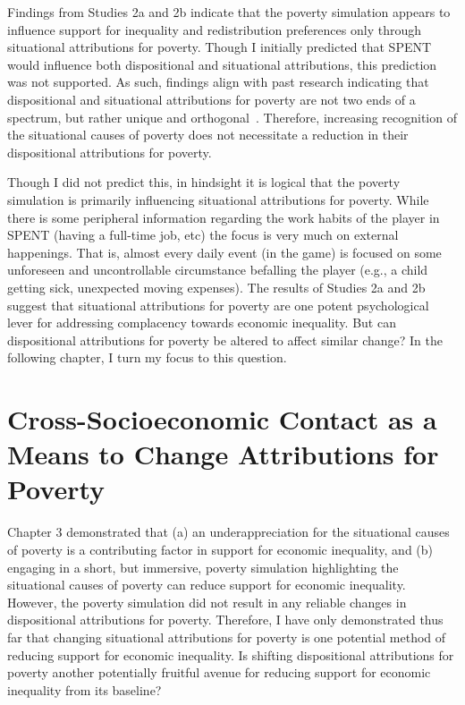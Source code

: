 \documentclass{sfuthesis}
\begin{document}
Findings from Studies 2a and 2b indicate that the poverty simulation appears to influence support for inequality and redistribution preferences only through situational attributions for poverty. Though I initially predicted that SPENT would influence both dispositional and situational attributions, this prediction was not supported. As such, findings align with past research indicating that dispositional and situational attributions for poverty are not two ends of a spectrum, but rather unique and orthogonal~\cite{miller81, solomon78}. Therefore, increasing recognition of the situational causes of poverty does not necessitate a reduction in their dispositional attributions for poverty.

Though I did not predict this, in hindsight it is logical that the poverty simulation is primarily influencing situational attributions for poverty. While there is some peripheral information regarding the work habits of the player in SPENT (having a full-time job, etc) the focus is very much on external happenings. That is, almost every daily event (in the game) is focused on some unforeseen and uncontrollable circumstance befalling the player (e.g., a child getting sick, unexpected moving expenses). The results of Studies 2a and 2b suggest that situational attributions for poverty are one potent psychological lever for addressing complacency towards economic inequality. But can dispositional attributions for poverty be altered to affect similar change? In the following chapter, I turn my focus to this question.

\chapter{Cross-Socioeconomic Contact as a Means to Change Attributions for Poverty}

Chapter 3 demonstrated that (a) an underappreciation for the situational causes of poverty is a contributing factor in support for economic inequality, and (b) engaging in a short, but immersive, poverty simulation highlighting the situational causes of poverty can reduce support for economic inequality. However, the poverty simulation did not result in any reliable changes in dispositional attributions for poverty. Therefore, I have only demonstrated thus far that changing situational attributions for poverty is one potential method of reducing support for economic inequality. Is shifting dispositional attributions for poverty another potentially fruitful avenue for reducing support for economic inequality from its baseline?
\end{document}
